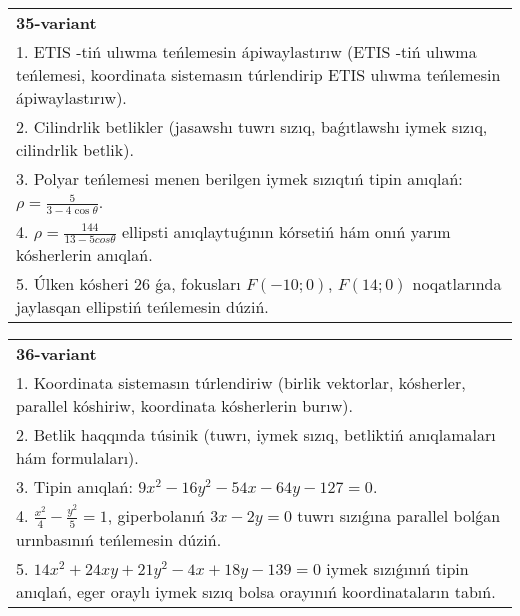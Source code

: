 \documentclass{article}
\begin{document}
\begin{tabular}{m{17cm}}
\textbf{35-variant}\\
1. ETIS -tiń ulıwma teńlemesin ápiwaylastırıw (ETIS -tiń ulıwma teńlemesi, koordinata sistemasın túrlendirip ETIS ulıwma teńlemesin ápiwaylastırıw).\\

2. Cilindrlik betlikler (jasawshı tuwrı sızıq, baǵıtlawshı iymek sızıq, cilindrlik betlik).\\

3. Polyar teńlemesi menen berilgen iymek sızıqtıń tipin anıqlań: $\rho=\frac{5}{3-4\cos\theta}$.\\

4. $\rho = \frac{144}{13 - 5cos\theta}$ ellipsti anıqlaytuǵının kórsetiń hám onıń yarım kósherlerin anıqlań.\\

5. Úlken kósheri 26 ǵa, fokusları $F( - 10;0)$, $F(14;0)$ noqatlarında jaylasqan ellipstiń teńlemesin dúziń.  
\end{tabular}
\vspace{1cm}


\begin{tabular}{m{17cm}}
\textbf{36-variant}\\
1. Koordinata sistemasın túrlendiriw (birlik vektorlar, kósherler, parallel kóshiriw, koordinata kósherlerin burıw).\\

2. Betlik haqqında túsinik (tuwrı, iymek sızıq, betliktiń anıqlamaları hám formulaları).\\

3. Tipin anıqlań: $9 x^{2}-16 y^{2}-54 x-64 y-127=0$.\\

4. $\frac{x^{2}}{4} - \frac{y^{2}}{5} = 1$, giperbolanıń $3x - 2y = 0$ tuwrı sızıǵına parallel bolǵan urınbasınıń teńlemesin dúziń.  \\

5. $14x^{2} + 24xy + 21y^{2} - 4x + 18y - 139 = 0$ iymek sızıǵınıń tipin anıqlań, eger oraylı iymek sızıq bolsa orayınıń koordinataların tabıń.  
\end{tabular}
\vspace{1cm}
\end{document}

